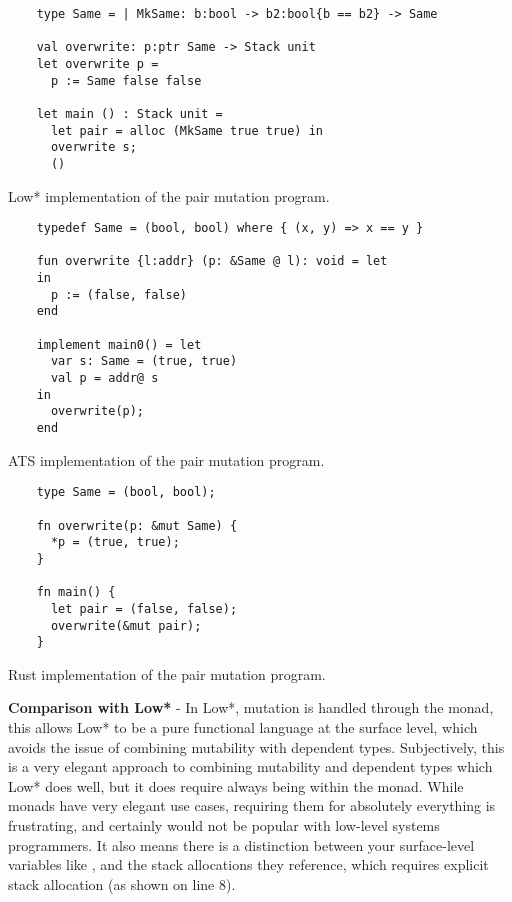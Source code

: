 \documentclass[12pt,twoside]{report}
\begin{document}
\begin{listing}
  \begin{verbatim}
    type Same = | MkSame: b:bool -> b2:bool{b == b2} -> Same

    val overwrite: p:ptr Same -> Stack unit
    let overwrite p =
      p := Same false false
      
    let main () : Stack unit =
      let pair = alloc (MkSame true true) in
      overwrite s;
      ()
  \end{verbatim}
  \caption{Low* implementation of the pair mutation program.}
  \label{listing:pairmutationlowstar}
\end{listing}

\begin{listing}
  \begin{verbatim}
    typedef Same = (bool, bool) where { (x, y) => x == y }

    fun overwrite {l:addr} (p: &Same @ l): void = let
    in
      p := (false, false)
    end

    implement main0() = let
      var s: Same = (true, true)
      val p = addr@ s
    in
      overwrite(p);
    end
  \end{verbatim}
  \caption{ATS implementation of the pair mutation program.}
  \label{listing:pairmutationats}
\end{listing}

\begin{listing}
  \begin{verbatim}
    type Same = (bool, bool);

    fn overwrite(p: &mut Same) {
      *p = (true, true);
    }

    fn main() {
      let pair = (false, false);          
      overwrite(&mut pair);
    }
  \end{verbatim}
  \caption{Rust implementation of the pair mutation program.}
  \label{listing:pairmutationrust}
\end{listing}

\textbf{Comparison with Low*} - In Low*, mutation is handled through the  monad, this allows Low* to be a pure functional language at the surface level, which avoids the issue of combining mutability with dependent types. Subjectively, this is a very elegant approach to combining mutability and dependent types which Low* does well, but it does require always being within the  monad. While monads have very elegant use cases, requiring them for absolutely everything is frustrating, and certainly would not be popular with low-level systems programmers. It also means there is a distinction between your surface-level variables like , and the stack allocations they reference, which requires explicit stack allocation (as shown on line 8).
\end{document}
